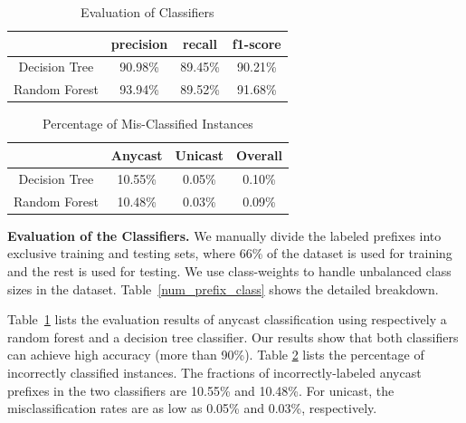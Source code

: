 \begin{table}[t]
\caption{Evaluation of Classifiers}
\small
\renewcommand{\arraystretch}{0.85}
\begin{center}
\begin{tabular}{ c c c c}
\toprule 
        & precision & recall & f1-score \\
\midrule 
Decision Tree & 90.98\% & 89.45\% & 90.21\% \\
Random Forest & 93.94\% & 89.52\% & 91.68\%  \\
\bottomrule
\end{tabular} 
\label{res_dt_rf}
\end{center}
\vspace{-3pt}
\end{table}

\begin{table}[t]
\caption{Percentage of Mis-Classified Instances}
\small
\renewcommand{\arraystretch}{0.85}
\begin{center}
\begin{tabular}{c c c c }
\toprule 
        & Anycast & Unicast & Overall \\
\midrule 
Decision Tree & 10.55\% & 0.05\% & 0.10\% \\
Random Forest & 10.48\% & 0.03\% & 0.09\%  \\
\bottomrule
\end{tabular} 
\label{res_mis}
\end{center}
\vspace{-3pt}
\end{table}

\vspace{2pt}
\textbf{Evaluation of the Classifiers. }
We manually divide the labeled prefixes into exclusive training and testing sets, where 66\% of the dataset is used for training and the rest is used for testing. We use class-weights to handle unbalanced class sizes in the dataset.  Table~\ref{num_prefix_class} shows the detailed breakdown.
 
Table~\ref{res_dt_rf} lists the evaluation results of anycast classification using respectively a random forest and a decision tree classifier. Our results show that both classifiers can achieve high accuracy (more than 90\%). Table \ref{res_mis} lists the percentage of incorrectly classified instances. The fractions of incorrectly-labeled anycast prefixes in the two classifiers are 10.55\% and 10.48\%. For unicast, the misclassification rates are as low as 0.05\% and 0.03\%, respectively. 

